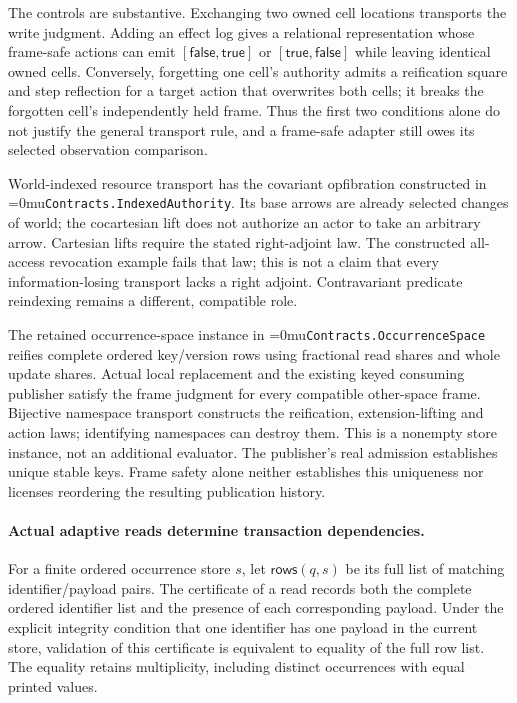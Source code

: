 \documentclass[11pt]{article}
\newcommand{\leanname}[1]{\textup{\Urlmuskip=0mu\relax\nolinkurl{#1}}}
\theoremstyle{definition}
\theoremstyle{remark}
\begin{document}
The controls are substantive. Exchanging two owned cell locations transports
the write judgment. Adding an effect log gives a relational representation
whose frame-safe actions can emit $[\mathsf{false},\mathsf{true}]$ or
$[\mathsf{true},\mathsf{false}]$ while leaving identical owned cells.
Conversely, forgetting one cell's authority admits a reification square and
step reflection for a target action that overwrites both cells; it breaks
the forgotten cell's independently held frame. Thus the first two conditions
alone do not justify the general transport rule, and a frame-safe adapter
still owes its selected observation comparison.

World-indexed resource transport has the covariant opfibration constructed
in \leanname{Contracts.IndexedAuthority}. Its base arrows are already
selected changes of world; the cocartesian lift does not authorize an actor
to take an arbitrary arrow. Cartesian lifts require the stated right-adjoint
law. The constructed all-access revocation example fails that law; this is
not a claim that every information-losing transport lacks a right adjoint.
Contravariant predicate reindexing remains a different, compatible role.

The retained occurrence-space instance in
\leanname{Contracts.OccurrenceSpace} reifies complete ordered key/version
rows using fractional read shares and whole update shares. Actual local
replacement and the existing keyed consuming publisher satisfy the frame
judgment for every compatible other-space frame. Bijective namespace
transport constructs the reification, extension-lifting and action laws;
identifying namespaces can destroy them. This is a nonempty store instance,
not an additional evaluator. The publisher's real admission establishes
unique stable keys. Frame safety alone neither establishes this uniqueness
nor licenses reordering the resulting publication history.

\paragraph{Actual adaptive reads determine transaction dependencies.}
For a finite ordered occurrence store $s$, let
$\mathsf{rows}(q,s)$ be its full list of matching identifier/payload pairs.
The certificate of a read records both the complete ordered identifier list
and the presence of each corresponding payload. Under the explicit integrity
condition that one identifier has one payload in the current store,
validation of this certificate is equivalent to equality of the full row list.
The equality retains multiplicity, including distinct occurrences with equal
printed values.
\end{document}
